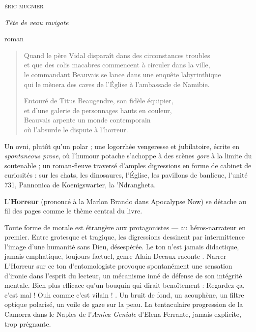 \documentclass[12pt,a4paper]{article}
\begin{document}
\pagestyle{empty}

\begin{center}
{\large\textsc{éric mugnier}}

\bigskip

{\Large\textit{Tête de veau ravigote}}

\medskip

{\small roman}
\end{center}

\bigskip\bigskip

\begin{quote}
Quand le père Vidal disparaît dans des circonstances troubles\\
et que des colis macabres commencent à circuler dans la ville,\\
le commandant Beauvais se lance dans une enquête labyrinthique\\
qui le mènera des caves de l'Église à l'ambassade de Namibie.

\medskip
Entouré de Titus Beaugendre, son fidèle équipier,\\
et d'une galerie de personnages hauts en couleur,\\
Beauvais arpente un monde contemporain\\
où l'absurde le dispute à l'horreur.
\end{quote}
\medskip

Un ovni, plutôt qu'un polar ; une logorrhée vengeresse et jubilatoire, écrite en
\textit{spontaneous prose}, où l'humour potache s'achoppe à des scènes \textit{gore}
à la limite du soutenable ; un roman-fleuve traversé d'amples digressions en forme
de cabinet de curiosités : sur les chats, les dinosaures, l'Église, les pavillons
de banlieue, l'unité 731, Pannonica de Koenigswarter, la 'Ndrangheta.

L'\textbf{Horreur} (prononcé à la Marlon Brando dans Apocalypse Now) se détache
au fil des pages comme le thème central du livre.

Toute forme de morale est étrangère aux protagonistes — au héros-narrateur en premier.
Entre grotesque et tragique, les digressions dessinent par intermittence l'image d'une
humanité sans Dieu, désespérée. Le ton n'est jamais didactique, jamais emphatique,
toujours factuel, genre \og Alain Decaux raconte \fg{}. Narrer L'Horreur sur ce ton
d'entomologiste provoque spontanément une sensation d'ironie dans l'esprit du lecteur,
un mécanisme inné de défense de son intégrité mentale. Bien plus efficace qu'un bouquin
qui dirait benoîtement : \og Regardez ça, c'est mal ! Ouh comme c'est vilain ! \fg{}.
Un bruit de fond, un acouphène, un filtre optique polarisé, un voile de gaze sur la peau.
La tentaculaire progression de la Camorra dans le Naples de l'\textit{Amica Geniale}
d'Elena Ferrante, jamais explicite, trop prégnante.
\end{document}
